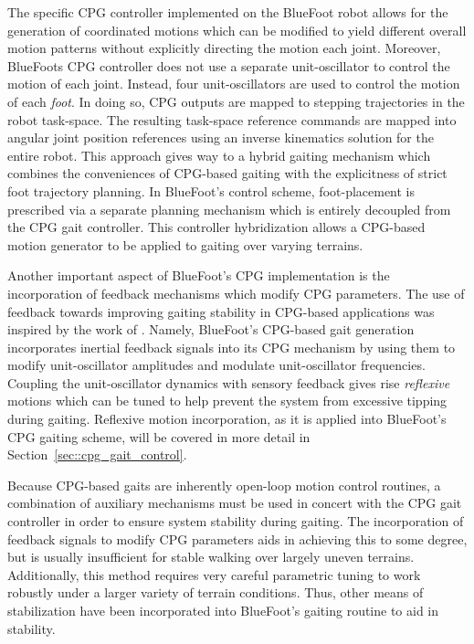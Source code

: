 		The specific CPG controller implemented on the BlueFoot robot allows for the generation of coordinated motions which can be modified to yield different overall motion patterns without explicitly directing the motion each joint. Moreover, BlueFoots CPG controller does not use a separate unit-oscillator to control the motion of each joint. Instead, four unit-oscillators are used to control the motion of each \emph{foot}. In doing so, CPG outputs are mapped to stepping trajectories in the robot task-space. The resulting task-space reference commands are mapped into angular joint position references using an inverse kinematics solution for the entire robot. This approach gives way to a hybrid gaiting mechanism which combines the conveniences of CPG-based gaiting with the explicitness of strict foot trajectory planning. In BlueFoot's control scheme, foot-placement is prescribed via a separate planning mechanism which is entirely decoupled from the CPG gait controller. This controller hybridization allows a CPG-based motion generator to be applied to gaiting over varying terrains.

		Another important aspect of BlueFoot's CPG implementation is the incorporation of feedback mechanisms which modify CPG parameters. The use of feedback towards improving gaiting stability in CPG-based applications was inspired by the work of \cite{Fukuoka2003,Endo2004}. Namely, BlueFoot's CPG-based gait generation incorporates inertial feedback signals into its CPG mechanism by using them to modify unit-oscillator amplitudes and modulate unit-oscillator frequencies. Coupling the unit-oscillator dynamics with sensory feedback gives rise \emph{reflexive} motions which can be tuned to help prevent the system from excessive tipping during gaiting. Reflexive motion incorporation, as it is applied into BlueFoot's CPG gaiting scheme, will be covered in more detail in Section~\ref{sec::cpg_gait_control}.

		Because CPG-based gaits are inherently open-loop motion control routines, a combination of auxiliary mechanisms must be used in concert with the CPG gait controller in order to ensure system stability during gaiting. The incorporation of feedback signals to modify CPG parameters aids in achieving this to some degree, but is usually insufficient for stable walking over largely uneven terrains.  Additionally, this method requires very careful parametric tuning to work robustly under a larger variety of terrain conditions. Thus, other means of stabilization have been incorporated into BlueFoot's gaiting routine to aid in stability. 

